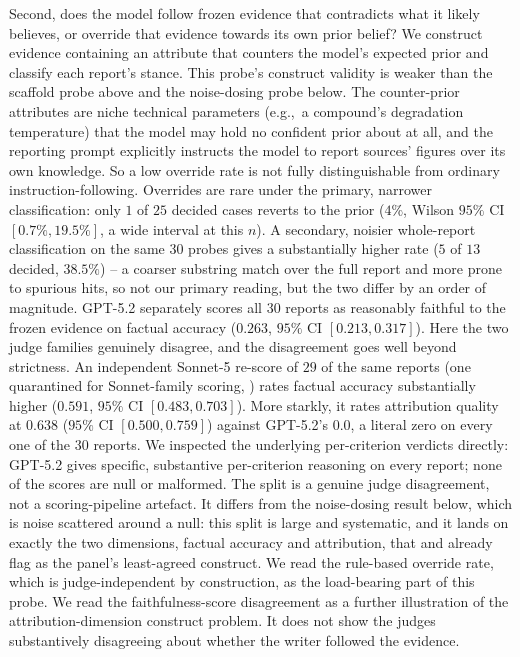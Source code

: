 \documentclass[11pt]{article}
\newcommand{\eg}{e.g.,\ }
\begin{document}
Second, does the model follow frozen evidence that contradicts what it likely believes, or
override that evidence towards its own prior belief? We construct evidence containing an attribute
that counters the model's expected prior and classify each report's stance. This probe's
construct validity is weaker than the scaffold probe above and the noise-dosing probe
below. The counter-prior attributes are niche
technical parameters (\eg a compound's degradation temperature) that the model may hold no
confident prior about at all, and the reporting prompt explicitly instructs the model to
report sources' figures over its own knowledge. So a low override rate is not fully
distinguishable from ordinary instruction-following. Overrides are
rare under the primary, narrower classification: only $1$ of $25$ decided cases reverts to the
prior ($4\%$, Wilson $95\%$ CI $[0.7\%, 19.5\%]$, a wide interval at this $n$). A secondary,
noisier whole-report classification on the same $30$ probes gives a substantially higher rate
($5$ of $13$ decided, $38.5\%$) -- a coarser substring match over the full report and more
prone to spurious hits, so not our primary reading, but the two differ by an order of
magnitude. GPT-5.2
separately
scores all $30$ reports as reasonably faithful to the frozen evidence on factual
accuracy ($0.263$, $95\%$ CI $[0.213, 0.317]$). Here the two judge families genuinely
disagree, and the disagreement goes well beyond strictness. An independent Sonnet-5 re-score of $29$ of the same reports
(one quarantined for Sonnet-family scoring, ) rates
factual accuracy substantially higher ($0.591$, $95\%$ CI $[0.483, 0.703]$). More starkly, it
rates attribution quality at $0.638$ ($95\%$ CI $[0.500, 0.759]$) against GPT-5.2's
$0.0$, a literal zero on every one of the $30$ reports. We inspected the underlying per-criterion
verdicts directly: GPT-5.2 gives specific, substantive per-criterion reasoning on every report;
none of the scores are null or malformed. The split is a genuine judge
disagreement, not a scoring-pipeline artefact. It differs from the noise-dosing result
below, which is noise scattered around a null: this split is large and systematic, and it lands on
exactly the two dimensions, factual accuracy and attribution, that  and
 already flag as the panel's least-agreed construct. We read the rule-based
override rate, which is judge-independent by construction, as the load-bearing part of this
probe. We read the faithfulness-score disagreement as a further illustration of the
attribution-dimension construct problem. It does not show the judges substantively disagreeing
about whether the writer followed the evidence.
\end{document}
